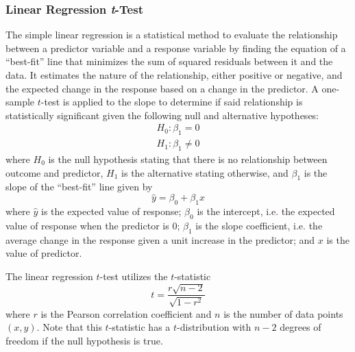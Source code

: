 \subsubsection{Linear Regression \textit{t}-Test}
\hfill \break 
The simple linear regression is a statistical method to evaluate the relationship between a predictor variable and a response variable by finding the equation of a ``best-fit'' line that minimizes the sum of squared residuals between it and the data. It estimates the nature of the relationship, either positive or negative, and the expected change in the response based on a change in the predictor. A one-sample $t$-test is applied to the slope to determine if said relationship is statistically significant given the following null and alternative hypotheses:
\begin{equation}
\begin{array}{c}
	H_0: \beta_1 = 0 \\
	H_1: \beta_1 \neq 0
\end{array}
\end{equation}
where \(H_0\) is the null hypothesis stating that there is no relationship between outcome and predictor, \(H_1\) is the alternative stating otherwise, and $\beta_1$ is the slope of the ``best-fit'' line given by
\begin{equation}
	\hat{y} = \beta_0 + \beta_1x
\end{equation}
where \(\hat{y}\) is the expected value of response; \(\beta_0\) is the intercept, i.e\textcolor{purple}{.} the expected value of response when the predictor is 0; \(\beta_1\) is the slope coefficient, i.e\textcolor{purple}{.} the average change in the response given a unit increase in the predictor; and $x$ is the value of predictor.

The linear regression $t$-test utilizes the $t$-statistic
\begin{equation}
	t=\frac{r\sqrt{n-2}}{\sqrt{1-r^2}}
\end{equation}
where $r$ is the Pearson correlation coefficient and $n$ is the number of data points $(x,y)$. Note that this $t$-statistic has a $t$-distribution with $n-2$ degrees of freedom if the null hypothesis is true.

